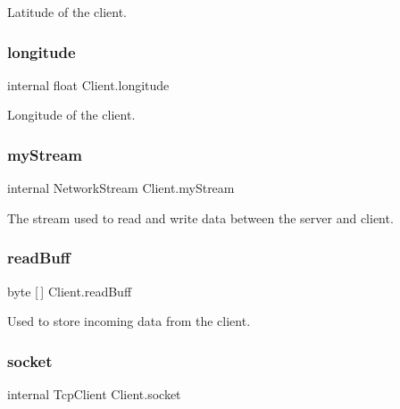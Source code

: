 Latitude of the client. 

\mbox{\label{class_client_ae67bee3b41d13425dc3a023778cb46fd}} 
\subsubsection{\texorpdfstring{longitude}{longitude}}
{\footnotesize\ttfamily internal float Client.\+longitude\hspace{0.3cm}{\ttfamily [private]}}



Longitude of the client. 

\mbox{\label{class_client_ac49f1e7df64018a7f6589fa216f1628e}} 
\subsubsection{\texorpdfstring{myStream}{myStream}}
{\footnotesize\ttfamily internal Network\+Stream Client.\+my\+Stream\hspace{0.3cm}{\ttfamily [private]}}



The stream used to read and write data between the server and client. 

\mbox{\label{class_client_ab0bcc2e82b84e460013e0789e485bb05}} 
\subsubsection{\texorpdfstring{readBuff}{readBuff}}
{\footnotesize\ttfamily byte \mbox{[}$\,$\mbox{]} Client.\+read\+Buff\hspace{0.3cm}{\ttfamily [private]}}



Used to store incoming data from the client. 

\mbox{\label{class_client_a01727b6e955e0735f26d6ccc8ba7b4c0}} 
\subsubsection{\texorpdfstring{socket}{socket}}
{\footnotesize\ttfamily internal Tcp\+Client Client.\+socket\hspace{0.3cm}{\ttfamily [private]}}




